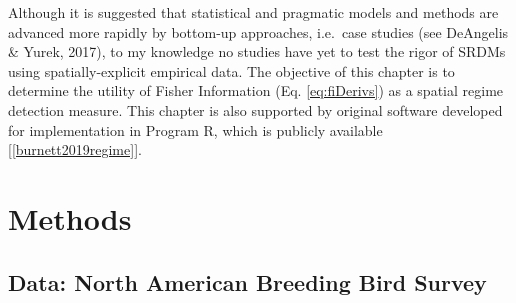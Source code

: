 \documentclass[12pt,twoside,openany]{reedthesis}
\begin{document}
Although it is suggested that statistical and pragmatic models and methods are advanced more rapidly by bottom-up approaches, i.e.~case studies (see DeAngelis \& Yurek, 2017), to my knowledge no studies have yet to test the rigor of SRDMs using spatially-explicit empirical data. The objective of this chapter is to determine the utility of Fisher Information (Eq. \eqref{eq:fiDerivs}) as a spatial regime detection measure. This chapter is also supported by original software developed for implementation in Program R, which is publicly available {[}\ref{burnett2019regime}{]}.

\hypertarget{methods-1}{%
\section{Methods}\label{methods-1}}

\hypertarget{data-north-american-breeding-bird-survey}{%
\subsection{Data: North American Breeding Bird Survey}\label{data-north-american-breeding-bird-survey}}
\end{document}
